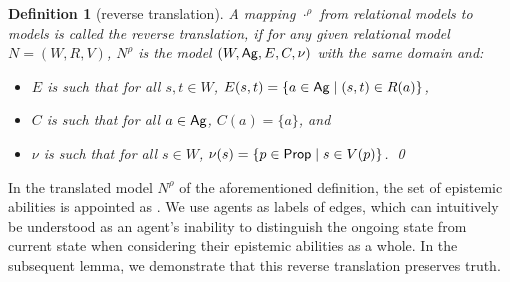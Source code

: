 \documentclass{article}
\newtheorem{definition}[theorem]{Definition}%
\newcommand{\ag}{\text{\normalfont\textsf{Ag}}\xspace}
\newcommand{\prop}{\text{\normalfont\textsf{Prop}}\xspace}
\begin{document}
\begin{definition}[reverse translation]\label{def:trans-w}
A mapping $\cdot^\rho$ from relational models to models is called the \emph{reverse translation}, if for any given relational model $N = (W,R,V)$, $N^\rho$ is the model $(W,\ag,E,C,\nu)$ with the same domain and:
\begin{itemize}
\item $E$ is such that for all $s,t \in W$, $E(s,t) = \{ a \in \ag \mid (s,t) \in R(a)\}$,
\item $C$ is such that for all $a \in \ag$, $C(a) = \{a\}$, and
\item $\nu$ is such that for all $s \in W$, $\nu(s) = \{ p \in \prop \mid s \in V(p)\}$.
\qed
\end{itemize}
\end{definition}
In the translated model $N^\rho$ of the aforementioned definition, the set of epistemic abilities is appointed as \ag. We use agents as labels of edges, which can intuitively be understood as an agent's inability to distinguish the ongoing state from current state when considering their epistemic abilities as a whole.
In the subsequent lemma, we demonstrate that this reverse translation preserves truth.
\end{document}
